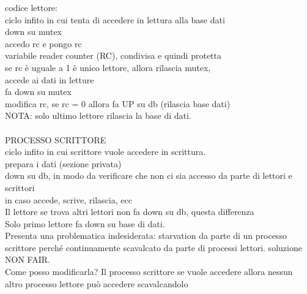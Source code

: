 \documentclass{article}
\begin{document}
codice lettore: \\
ciclo infito in cui tenta di accedere in lettura alla base dati \\
down su mutex \\
accedo rc e pongo rc\\
variabile reader counter (RC), condivisa e quindi protetta\\
se rc è uguale a 1 è unico lettore, allora rilascia mutex, \\
accede ai dati in letture\\
fa down su mutex\\
modifica rc, se rc = 0 allora fa UP su db (rilascia base dati)\\
NOTA: solo ultimo lettore rilascia la base di dati.\\
\\
PROCESSO SCRITTORE\\
ciclo infito in cui scrittore vuole accedere in scrittura.\\
prepara i dati (sezione privata)\\
down su db, in modo da verificare che non ci sia accesso da parte di lettori e scrittori\\
in caso accede, scrive, rilascia, ecc\\
Il lettore se trova altri lettori non fa down su db, questa differenza\\
Solo primo lettore fa down su base di dati.\\
Presenta una problematica indesiderata: starvation da parte di un processo 
scrittore perché continuamente scavalcato da parte di processi lettori. soluzione NON FAIR.\\
Come posso modificarla? Il processo scrittore se vuole accedere allora nessun altro processo lettore 
può accedere scavalcandolo
\end{document}
